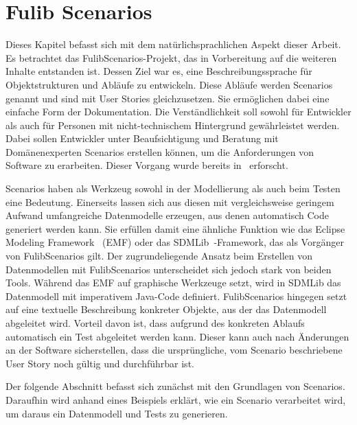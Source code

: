 \chapter{Fulib Scenarios}\label{ch:fulib-scenarios}

Dieses Kapitel befasst sich mit dem natürlichsprachlichen Aspekt dieser Arbeit.
Es betrachtet das FulibScenarios-Projekt, das in Vorbereitung auf die weiteren Inhalte entstanden ist.
Dessen Ziel war es, eine Beschreibungssprache für Objektstrukturen und Abläufe zu entwickeln.
Diese Abläufe werden Scenarios genannt und sind mit User Stories gleichzusetzen.
Sie ermöglichen dabei eine einfache Form der Dokumentation.
Die Verständlichkeit soll sowohl für Entwickler als auch für Personen mit nicht-technischem Hintergrund gewährleistet werden.
Dabei sollen Entwickler unter Beaufsichtigung und Beratung mit Domänenexperten Scenarios erstellen können, um die Anforderungen von Software zu erarbeiten.
Dieser Vorgang wurde bereits in~\cite{explain} erforscht.

Scenarios haben als Werkzeug sowohl in der Modellierung als auch beim Testen eine Bedeutung.
Einerseits lassen sich aus diesen mit vergleichsweise geringem Aufwand umfangreiche Datenmodelle erzeugen, aus denen automatisch Code generiert werden kann.
Sie erfüllen damit eine ähnliche Funktion wie das Eclipse Modeling Framework~\cite{emf} (EMF) oder das SDMLib~\cite{networkparser}-Framework, das als Vorgänger von FulibScenarios gilt.
Der zugrundeliegende Ansatz beim Erstellen von Datenmodellen mit FulibScenarios unterscheidet sich jedoch stark von beiden Tools.
Während das EMF auf graphische Werkzeuge setzt, wird in SDMLib das Datenmodell mit imperativem Java-Code definiert.
FulibScenarios hingegen setzt auf eine textuelle Beschreibung konkreter Objekte, aus der das Datenmodell abgeleitet wird.
Vorteil davon ist, dass aufgrund des konkreten Ablaufs automatisch ein Test abgeleitet werden kann.
Dieser kann auch nach Änderungen an der Software sicherstellen, dass die ursprüngliche, vom Scenario beschriebene User Story noch gültig und durchführbar ist.

Der folgende Abschnitt befasst sich zunächst mit den Grundlagen von Scenarios.
Daraufhin wird anhand eines Beispiels erklärt, wie ein Scenario verarbeitet wird, um daraus ein Datenmodell und Tests zu generieren.



